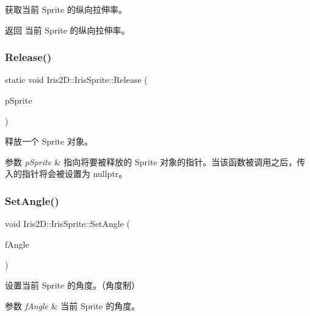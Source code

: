 获取当前 Sprite 的纵向拉伸率。 

\begin{DoxyReturn}{返回}
当前 Sprite 的纵向拉伸率。 
\end{DoxyReturn}
\mbox{\label{class_iris2_d_1_1_iris_sprite_aa225c6483e0282375187b092ea0cecf9}} 
\subsubsection{\texorpdfstring{Release()}{Release()}}
{\footnotesize\ttfamily static void Iris2\+D\+::\+Iris\+Sprite\+::\+Release (\begin{DoxyParamCaption}\item[{\hyperlink{class_iris2_d_1_1_iris_sprite}{Iris\+Sprite} $\ast$\&}]{p\+Sprite }\end{DoxyParamCaption})\hspace{0.3cm}{\ttfamily [static]}}



释放一个 Sprite 对象。 


\begin{DoxyParams}{参数}
{\em p\+Sprite} & 指向将要被释放的 Sprite 对象的指针。当该函数被调用之后，传入的指针将会被设置为 nullptr。 \\
\hline
\end{DoxyParams}
\mbox{\label{class_iris2_d_1_1_iris_sprite_a3fdbc5131b10eb0cb544df0beee82da2}} 
\subsubsection{\texorpdfstring{Set\+Angle()}{SetAngle()}}
{\footnotesize\ttfamily void Iris2\+D\+::\+Iris\+Sprite\+::\+Set\+Angle (\begin{DoxyParamCaption}\item[{float}]{f\+Angle }\end{DoxyParamCaption})}



设置当前 Sprite 的角度。（角度制） 


\begin{DoxyParams}{参数}
{\em f\+Angle} & 当前 Sprite 的角度。 \\
\hline
\end{DoxyParams}
\mbox{\label{class_iris2_d_1_1_iris_sprite_a17609cfcb89b4ea714389c40f143c7af}} 
